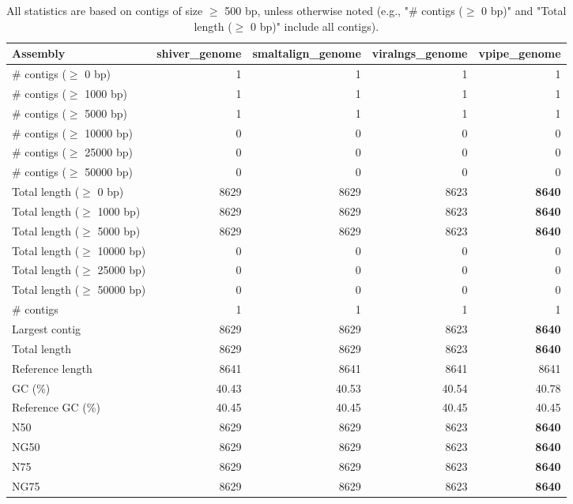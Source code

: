 \documentclass[12pt,a4paper]{article}
\begin{document}
\begin{table}[ht]
\begin{center}
\caption{All statistics are based on contigs of size $\geq$ 500 bp, unless otherwise noted (e.g., "\# contigs ($\geq$ 0 bp)" and "Total length ($\geq$ 0 bp)" include all contigs).}
\begin{tabular}{|l*{4}{|r}|}
\hline
Assembly & shiver\_genome & smaltalign\_genome & viralngs\_genome & vpipe\_genome \\ \hline
\# contigs ($\geq$ 0 bp) & 1 & 1 & 1 & 1 \\ \hline
\# contigs ($\geq$ 1000 bp) & 1 & 1 & 1 & 1 \\ \hline
\# contigs ($\geq$ 5000 bp) & 1 & 1 & 1 & 1 \\ \hline
\# contigs ($\geq$ 10000 bp) & 0 & 0 & 0 & 0 \\ \hline
\# contigs ($\geq$ 25000 bp) & 0 & 0 & 0 & 0 \\ \hline
\# contigs ($\geq$ 50000 bp) & 0 & 0 & 0 & 0 \\ \hline
Total length ($\geq$ 0 bp) & 8629 & 8629 & 8623 & {\bf 8640} \\ \hline
Total length ($\geq$ 1000 bp) & 8629 & 8629 & 8623 & {\bf 8640} \\ \hline
Total length ($\geq$ 5000 bp) & 8629 & 8629 & 8623 & {\bf 8640} \\ \hline
Total length ($\geq$ 10000 bp) & 0 & 0 & 0 & 0 \\ \hline
Total length ($\geq$ 25000 bp) & 0 & 0 & 0 & 0 \\ \hline
Total length ($\geq$ 50000 bp) & 0 & 0 & 0 & 0 \\ \hline
\# contigs & 1 & 1 & 1 & 1 \\ \hline
Largest contig & 8629 & 8629 & 8623 & {\bf 8640} \\ \hline
Total length & 8629 & 8629 & 8623 & {\bf 8640} \\ \hline
Reference length & 8641 & 8641 & 8641 & 8641 \\ \hline
GC (\%) & 40.43 & 40.53 & 40.54 & 40.78 \\ \hline
Reference GC (\%) & 40.45 & 40.45 & 40.45 & 40.45 \\ \hline
N50 & 8629 & 8629 & 8623 & {\bf 8640} \\ \hline
NG50 & 8629 & 8629 & 8623 & {\bf 8640} \\ \hline
N75 & 8629 & 8629 & 8623 & {\bf 8640} \\ \hline
NG75 & 8629 & 8629 & 8623 & {\bf 8640} \\ \hline

\end{tabular}
\end{center}
\end{table}
\end{document}
